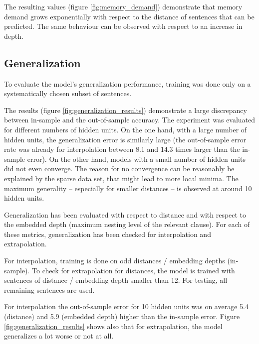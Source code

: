 \documentclass[11pt,a4paper]{article}
\begin{document}
The resulting values (figure \ref{fig:memory_demand}) demonstrate that memory demand grows exponentially with respect to the distance of sentences that can be predicted. The same behaviour can be observed with respect to an increase in depth. 

\subsection{Generalization}
\label{subsec:generalization}

To evaluate the model's generalization performance, training was done only on a systematically chosen subset of sentences.

The results (figure \ref{fig:generalization_results}) demonstrate a large discrepancy between in-sample and the out-of-sample accuracy. The experiment was evaluated for different numbers of hidden units. On the one hand, with a large number of hidden units, the generalization error is similarly large (the out-of-sample error rate was already for interpolation between 8.1 and 14.3 times larger than the in-sample error). %
On the other hand, models with a small number of hidden units did not even converge. The reason for no convergence can be reasonably be explained by the sparse data set, that might lead to more local minima. The maximum generality -- especially for smaller distances -- is observed at around 10 hidden units.

Generalization has been evaluated with respect to distance and with respect to the embedded depth (maximum nesting level of the relevant clause). For each of these metrics, generalization has been checked for interpolation and extrapolation.

For interpolation, training is done on odd distances / embedding depths (in-sample). To check for extrapolation for distances, the model is trained with sentences of distance / embedding depth smaller than 12. For testing, all remaining sentences are used.

For interpolation the out-of-sample error for 10 hidden units was on average 5.4 (distance) and 5.9 (embedded depth) higher than the in-sample error. Figure \ref{fig:generalization_results} shows also that for extrapolation, the model generalizes a lot worse or not at all.
\end{document}
